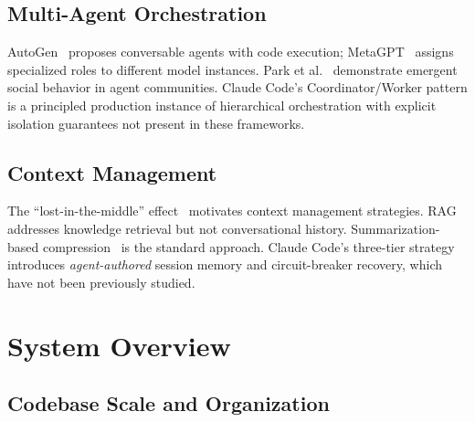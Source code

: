 \documentclass{article}
\begin{document}
\subsection{Multi-Agent Orchestration}

AutoGen~\cite{wu2023autogen} proposes conversable agents with code execution; MetaGPT~\cite{hong2023metagpt} assigns specialized roles to different model instances. Park et al.~\cite{park2023generative} demonstrate emergent social behavior in agent communities. Claude Code's Coordinator/Worker pattern is a principled production instance of hierarchical orchestration with explicit isolation guarantees not present in these frameworks.

\subsection{Context Management}

The ``lost-in-the-middle'' effect~\cite{liu2023lost} motivates context management strategies. RAG~\cite{lewis2020retrieval} addresses knowledge retrieval but not conversational history. Summarization-based compression~\cite{zhang2024survey} is the standard approach. Claude Code's three-tier strategy introduces \emph{agent-authored} session memory and circuit-breaker recovery, which have not been previously studied.

\section{System Overview}

\subsection{Codebase Scale and Organization}
\end{document}
